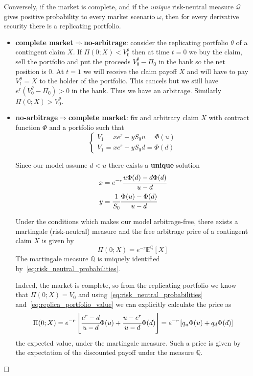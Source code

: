 \documentclass[12pt,a4paper]{book}
\newcommand{\myendproof}{\ensuremath{\hfill\square}}
\begin{document}
Conversely, if the market is complete, and if the \emph{unique} risk-neutral measure $\mathcal{Q}$ gives positive probability to every market scenario $\omega$, then for every derivative security there is a replicating portfolio.
\begin{itemize}
\item \textbf{complete market$\Rightarrow$no-arbitrage}: consider the replicating portfolio $\theta$ of a contingent claim $X$. If $\Pi(0; X) < V_0^\theta$ then at time $t=0$ we buy the claim, sell the portfolio and put the proceeds $V_0^\theta-\Pi_0$ in the bank so the net position is 0. At $t=1$ we will receive the claim payoff $X$ and will have to pay $V_1^\theta =X$  to the holder of the portfolio. This cancels but we still have $e^r(V_0^\theta-\Pi_0)>0$ in the bank. Thus we have an arbitrage. Similarly $\Pi(0; X) > V_0^\theta$.
\item \textbf{no-arbitrage$\Rightarrow$complete market}: fix and arbitrary claim $X$ with contract function $\Phi$ and a portfolio such that
\begin{equation*}
\begin{cases}
V_1 = x e^r + yS_0u = \Phi(u)\\
V_1 = x e^r + yS_0d = \Phi(d)
\end{cases}
\end{equation*}
			
Since our model assume $d<u$ there exists a \textbf{unique} solution
\begin{equation}
\begin{aligned}
x &= e^{-r}\cfrac{u\Phi(d)-d\Phi(d)}{u-d} \\
y &= \cfrac{1}{S_0}\cfrac{\Phi(u)-\Phi(d)}{u-d}
\end{aligned}
\label{eq:replica_portfolio_value}
\end{equation}

Under the conditions which makes our model arbitrage-free, there exists a martingale (risk-neutral) measure and the free arbitrage price of a contingent claim $X$ is given by 
\begin{equation*}
\Pi(0; X) = e^{-r}\mathbb{E}^{\mathbb{Q}}[X]
\end{equation*} 
The martingale measure $\mathbb{Q}$ is uniquely identified by~\ref{eq:risk_neutral_probabilities}.
		
Indeed, the market is complete, so from the replicating portfolio we know that $\Pi(0;X) = V_0$ and using~\ref{eq:risk_neutral_probabilities} and~\ref{eq:replica_portfolio_value} we can explicitly calculate the price as
\begin{equation*}
\Pi(0;X) = e^{-r}\left[\cfrac{e^r-d}{u-d}\Phi(u)+\cfrac{u-e^r}{u-d}\Phi(d)\right] = e^{-r}\left[q_u\Phi(u)+q_d\Phi(d)\right]
\end{equation*}
the expected value, under the martingale measure.
Such a price is given by the expectation of the discounted payoff under the measure $\mathbb{Q}$.
\end{itemize}
\myendproof
\end{document}
